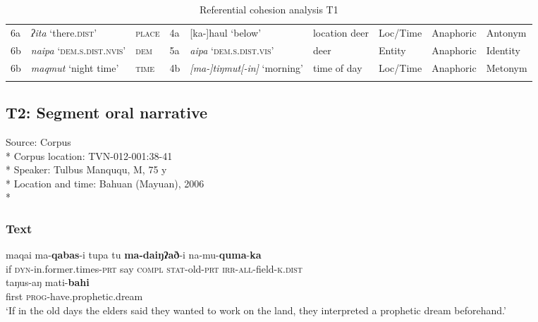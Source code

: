 \documentclass[output=paper
,modfonts
,nonflat]{langsci/langscibook}
\begin{document}
\begin{sidewaystable}
{\begin{tabular}{ll l lll lll}
	6a & \textit{ʔita} ‘there.\textsc{dist}’ & \textsc{place} & 4a & [ka-]haul ‘below’ & location deer & Loc/Time & Anaphoric & Antonym\\
	6b & \textit{naipa} ‘\textsc{dem.s.dist.nvis}’ & \textsc{dem} & 5a & \textit{aipa} ‘\textsc{dem.s.dist.vis}’ & deer & Entity & Anaphoric & Identity\\
	6b & \textit{maqmut} ‘night time’ & \textsc{time} & 4b & \textit{[ma-]tiŋmut[-in]} ‘morning’ & time of day & Loc/Time & Anaphoric & Metonym\\
	\lspbottomrule
\end{tabular}
}
\caption{\label{tab:debusser:10}Referential cohesion analysis T1} 
\end{sidewaystable}

\clearpage
\subsection*{T2: Segment oral narrative}

Source:   Corpus\\*
Corpus location: TVN-012-001:38-41\\*
Speaker: Tulbus Manququ, M, 75 y\\*
Location and time: Bahuan (Mayuan), 2006\\*

\subsubsection*{Text}

\begin{exe}
	\label{tx2-1}
	\begin{xlist}
		\ex\label{tx2-1a}
		\gll maqai  ma-\textbf{qabas}{}-i  tupa  tu  \textbf{ma-daiŋʔað}{}-i  na-mu-\textbf{quma}{}-\textbf{ka}\\
		if  \textsc{dyn}{}-in.former.times-\textsc{prt}  say  \textsc{compl}  \textsc{stat}{}-old-\textsc{prt}  \textsc{irr}{}-\textsc{all}{}-field-\textsc{k.dist}\\
		\ex\label{tx2-1b}
		\gll taŋus-aŋ  mati-\textbf{bahi}\\
		first  \textsc{prog}{}-have.prophetic.dream\\
		\glt `‎‎If in the old days the elders said they wanted to work on the land, they interpreted a prophetic dream beforehand.’
	\end{xlist}
\end{exe}
\end{document}
